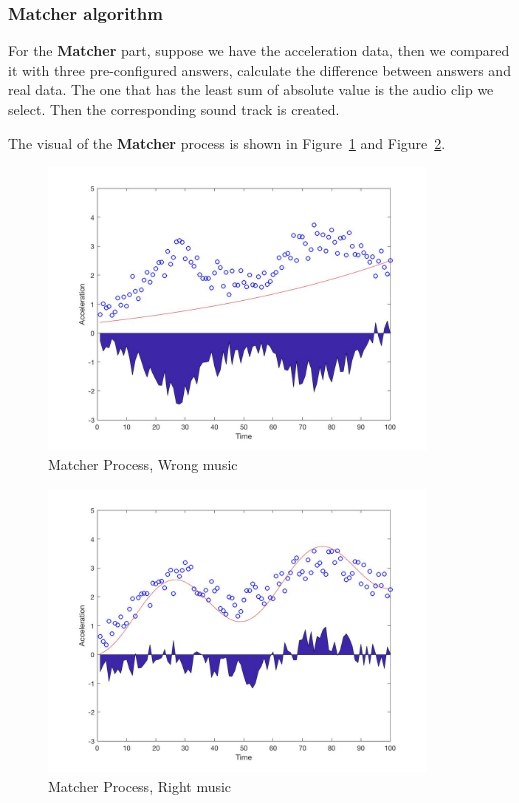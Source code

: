 \subsubsection{Matcher algorithm}

   For the \textbf{Matcher} part, suppose we have the acceleration data,
   then we compared it with three pre-configured answers,
   calculate the difference between answers and real data.
   The one that has the least sum of absolute value is the audio clip we select.
   Then the corresponding sound track is created.

   The visual of the \textbf{Matcher} process is shown in
   Figure~\ref{matcherStep0} and Figure~\ref{matcherStep1}. 


\newcommand{\widthOfMatcherFigure}{10cm}
\begin{figure}[H]
\centering
\includegraphics[width=\widthOfMatcherFigure]{figWR/matcher1}
\caption{Matcher Process, Wrong music}
\label{matcherStep0}
\end{figure}

\begin{figure}[H]
\centering
\includegraphics[width=\widthOfMatcherFigure]{figWR/matcher2}
\caption{Matcher Process, Right music}
\label{matcherStep1}
\end{figure}

